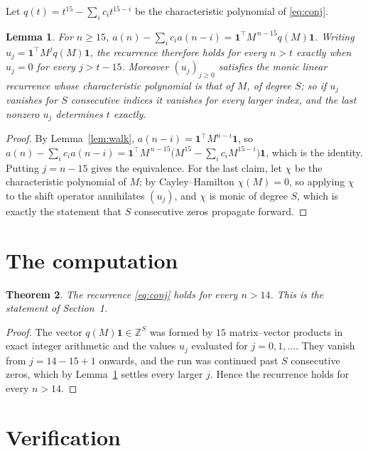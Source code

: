 \documentclass[11pt,a4paper]{article}
\theoremstyle{plain}
\newtheorem{theorem}{Theorem}
\newtheorem{lemma}[theorem]{Lemma}
\theoremstyle{definition}
\begin{document}
Let $q(t)=t^{15}-\sum_i c_i t^{15-i}$ be the characteristic polynomial of
\eqref{eq:conj}.

\begin{lemma}\label{lem:crit}
For $n\ge15$,
$a(n)-\sum_i c_i a(n-i)=\mathbf{1}^{\!\top}M^{\,n-15}q(M)\mathbf{1}$. Writing
$u_j=\mathbf{1}^{\!\top}M^{j}q(M)\mathbf{1}$, the recurrence therefore holds for every
$n>t$ exactly when $u_j=0$ for every $j>t-15$. Moreover $(u_j)_{j\ge0}$ satisfies the
monic linear recurrence whose characteristic polynomial is that of $M$, of degree $S$; so
if $u_j$ vanishes for $S$ consecutive indices it vanishes for every larger index, and the
last nonzero $u_j$ determines $t$ exactly.
\end{lemma}

\begin{proof}
By Lemma~\ref{lem:walk}, $a(n-i)=\mathbf{1}^{\!\top}M^{n-i}\mathbf{1}$, so
$a(n)-\sum_i c_i a(n-i)
=\mathbf{1}^{\!\top}M^{\,n-15}\bigl(M^{15}-\sum_i c_i M^{15-i}\bigr)
\mathbf{1}$, which is the identity. Putting $j=n-15$ gives the equivalence. For the
last claim, let $\chi$ be the characteristic polynomial of $M$; by Cayley--Hamilton
$\chi(M)=0$, so applying $\chi$ to the shift operator annihilates $(u_j)$, and $\chi$ is
monic of degree $S$, which is exactly the statement that $S$ consecutive zeros propagate
forward.
\end{proof}

\section{The computation}

\begin{theorem}
The recurrence \eqref{eq:conj} holds for every $n>14$. This is the statement of
Section~1.
\end{theorem}

\begin{proof}
The vector $q(M)\mathbf{1}\in\mathbb{Z}^{S}$ was formed by $15$ matrix--vector
products in exact integer arithmetic and the values $u_j$ evaluated for
$j=0,1,\dots$. They vanish from $j=14-15+1$ onwards, and the run was continued past
$S$ consecutive zeros, which by Lemma~\ref{lem:crit} settles every larger $j$. Hence the
recurrence holds for every $n>14$.
\end{proof}

\section{Verification}
\end{document}
